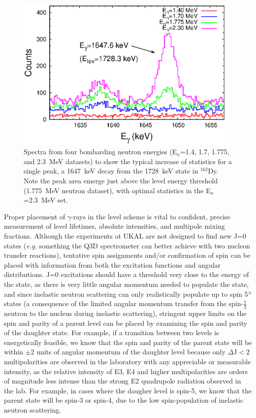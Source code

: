 \begin{figure}[h!]
\begin{center}
\includegraphics[width=0.97\textwidth]{ExF_difference_140_230.eps}
\caption{Spectra from four bombarding neutron energies (E$_n$=1.4, 1.7, 1.775, and 2.3~MeV datasets) to show the typical increase of statistics for a single peak, a 1647~keV decay from the 1728~keV state in $^{162}$Dy. Note the peak area emerge just above the level energy threshold (1.775~MeV neutron dataset), with optimal statistics in the E$_n$=2.3~MeV set.
\label{fig:ExF_difference_140_230}}
\end{center}
\end{figure}

Proper placement of $\gamma$-rays in the level scheme is vital to confident, precise measurement of level lifetimes, absolute intensities, and multipole mixing fractions. Although the experiments at UKAL are not designed to find new J=0 states (\textit{e.g.} something the Q3D spectrometer can better achieve with two nucleon transfer reactions), tentative spin assignments and/or confirmation of spin can be placed with information from both the excitation functions and angular distributions. J=0 excitations should have a threshold very close to the energy of the state, as there is very little angular momentum needed to populate the state, and since inelastic neutron scattering can only realistically populate up to spin 5$^\pm$ states (a consequence of the limited angular momentum transfer from the spin-$\frac{1}{2}$ neutron to the nucleus during inelastic scattering), stringent upper limits on the spin and parity of a parent level can be placed by examining the spin and parity of the daughter state. For example, if a transition between two levels is energetically feasible, we know that the spin and parity of the parent state will be within $\pm$2 units of angular momentum of the daughter level because only $\Delta$J$<$2 multipolarities are observed in the laboratory with any appreciable or measurable intensity, as the relative intensity of E3, E4 and higher multipolarities are orders of magnitude less intense than the strong E2 quadrupole radiation observed in the lab.  For example, in cases where the daugher level is spin-5, we know that the parent state will be spin-3 or spin-4, due to the low spin-population of inelastic neutron scattering. 

